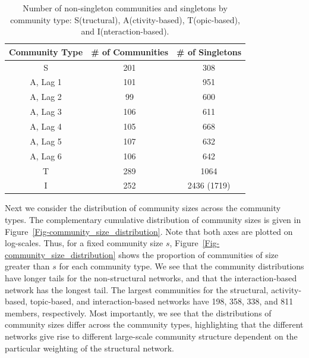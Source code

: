\begin{table}[ht]
	\caption{Number of non-singleton communities and singletons by community type: S(tructural), A(ctivity-based), T(opic-based), and I(nteraction-based).}
	\centering
	\begin{tabular}{| c | c | c |}
		\hline Community Type & \# of Communities & \# of Singletons \\ \hline
		S & 201 & 308 \\
		A, Lag 1 & 101 & 951 \\
		A, Lag 2 & 99 & 600 \\
		A, Lag 3 & 106 & 611 \\
		A, Lag 4 & 105 & 668 \\
		A, Lag 5 & 107 & 632 \\
		A, Lag 6 & 106 & 642 \\
		T & 289 & 1064 \\
		I & 252 & 2436 (1719) \\ \hline
	\end{tabular}
	\label{Table-comm_count}
\end{table}

Next we consider the distribution of community sizes across the community types. The complementary cumulative distribution of community sizes is given in Figure~\ref{Fig-community_size_distribution}. Note that both axes are plotted on log-scales. Thus, for a fixed community size $s$, Figure~\ref{Fig-community_size_distribution} shows the proportion of communities of size greater than $s$ for each community type. We see that the community distributions have longer tails for the non-structural networks, and that the interaction-based network has the longest tail. The largest communities for the structural, activity-based, topic-based, and interaction-based networks have 198, 358, 338, and 811 members, respectively. Most importantly, we see that the distributions of community sizes differ across the community types, highlighting that the different networks give rise to different large-scale community structure dependent on the particular weighting of the structural network.


